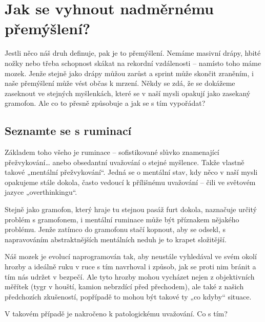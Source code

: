 \documentclass[main.tex]{subfiles}
\begin{document}
\section{Jak se vyhnout nadměrnému přemýšlení?}
Jestli něco náš druh definuje, pak je to přemýšlení. Nemáme masivní drápy, hbité nožky nebo třeba schopnost skákat na rekordní vzdálenosti – namísto toho máme mozek. Jenže stejně jako drápy můžou zarůst a sprint může skončit zraněním, i naše přemýšlení může vést občas k mrzení. Někdy se zdá, že se dokážeme zaseknout ve stejných myšlenkách, které se v naší mysli opakují jako zasekaný gramofon. Ale co to přesně způsobuje a jak se s tím vypořádat?
\subsection*{Seznamte se s ruminací}
Základem toho všeho je ruminace – sofistikované slůvko znamenající přežvykování… anebo obsedantní uvažování o stejné myšlence. Takže vlastně takové „mentální přežvykování“. Jedná se o mentální stav, kdy něco v naší mysli opakujeme stále dokola, často vedoucí k přílišnému uvažování – čili ve světovém jazyce „overthinkingu“.\par
Stejně jako gramofon, který hraje tu stejnou pasáž furt dokola, naznačuje určitý problém s gramofonem, i mentální ruminace může být příznakem nějakého problému. Jenže zatímco do gramofonu stačí kopnout, aby se odsekl, s napravováním abstraktnějších mentálních neduh je to krapet složitější.\par
Náš mozek je evolucí naprogramován tak, aby neustále vyhledával ve svém okolí hrozby a ideálně ruku v ruce s tím navrhoval i způsob, jak se proti nim bránit a tím nás udržet v bezpečí. Ale tyto hrozby mohou vycházet nejen z objektivních měřítek (tygr v houští, kamion nebrzdící před přechodem), ale také z našich předchozích zkušeností, popřípadě to mohou být takové ty „co kdyby“ situace.\par
V takovém případě je nakročeno k patologickému uvažování. Co s tím? 
\end{document}
